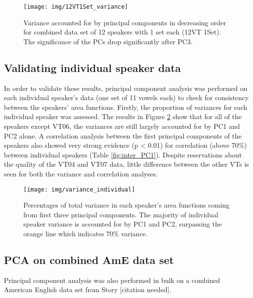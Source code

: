 \begin{figure}[H]
  \centering
  \texttt{[image: img/12VT1Set\_variance]}
  \caption{Variance accounted for by principal components in decreasing order for combined data set of 12 speakers with 1 set each (12VT 1Set). The significance of the PCs drop significantly after PC3.}
  \label{fig:12VT1Set_variance}
\end{figure}

\subsection{Validating individual speaker data}

In order to validate these results, principal component analysis was performed on each individual speaker's data (one set of 11 vowels each) to check for consistency between the speakers' area functions. Firstly, the proportion of variances for each individual speaker was assessed. The results in Figure \ref{fig:speaker-variance} show that for all of the speakers except VT06, the variances are still largely accounted for by PC1 and PC2 alone. A correlation analysis between the first principal components of the speakers also showed very strong evidence (p < 0.01) for correlation (above 70\%) between individual speakers (Table \ref{fig:inter_PC1}). Despite reservations about the quality of the VT04 and VT07 data, little difference between the other VTs is seen for both the variance and correlation analyses.

\begin{figure}[H]
  \centering
  \texttt{[image: img/variance\_individual]}
  \caption{Percentages of total variance in each speaker's area functions coming from first three principal components. The majority of individual speaker variance is accounted for by PC1 and PC2, surpassing the orange line which indicates 70\% variance.}
  \label{fig:speaker-variance}
\end{figure}

\subsection{PCA on combined AmE data set}

Principal component analysis was also performed in bulk on a combined American English data set from Story [citation needed].